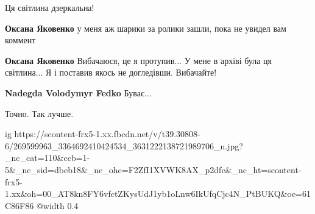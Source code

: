  
 
 
 
 

Ця світлина дзеркальна!

\textbf{Оксана Яковенко} у меня аж шарики за ролики зашли, пока не увидел вам коммент

\textbf{Оксана Яковенко} Вибачаюся, це я протупив... У мене в архіві була ця світлина... Я і поставив якось не догледівши. Вибачайте!

\textbf{Nadegda Volodymyr Fedko} Буває...

Точно. Так лучше.

\ifcmt
  ig https://scontent-frx5-1.xx.fbcdn.net/v/t39.30808-6/269599963_3364692410424534_3631222138721989706_n.jpg?_nc_cat=110&ccb=1-5&_nc_sid=dbeb18&_nc_ohc=F2ZfI1XVWK8AX_p2dfc&_nc_ht=scontent-frx5-1.xx&oh=00_AT8kn8FY6vfctZKysUdJ1yb1oLnw6IkUfqCjc4N_PtBUKQ&oe=61C86F86
  @width 0.4
\fi
